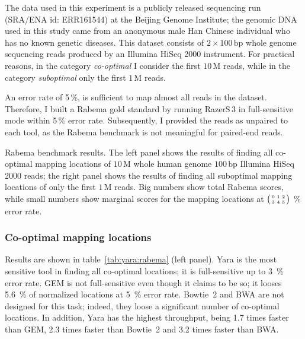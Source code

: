 The data used in this experiment is a publicly released sequencing run (SRA/ENA id: ERR161544) at the Beijing Genome Institute;
the genomic DNA used in this study came from an anonymous male Han Chinese individual who has no known genetic diseases.
This dataset consists of $2 \times 100\,\text{bp}$ whole genome sequencing reads produced by an Illumina HiSeq 2000 instrument.
For practical reasons, in the category \emph{co-optimal} I consider the first $10\,\text{M}$ reads, while in the category \emph{suboptimal} only the first $1\,\text{M}$ reads.

An error rate of 5\,\%, is sufficient to map almost all reads in the dataset.
Therefore, I built a Rabema gold standard by running RazerS\,3 in full-sensitive mode within 5\,\% error rate.
Subsequently, I provided the reads as unpaired to each tool, as the Rabema benchmark is not meaningful for paired-end reads.

\begin{table*}[t]
  \caption[Yara results in the Rabema benchmark]
  {
  \label{tab:yara:rabema}
    Rabema benchmark results.
    The left panel shows the results of finding all co-optimal mapping locations of $10\,\text{M}$ whole human genome $100\,\text{bp}$ Illumina HiSeq 2000 reads; the right panel shows the results of finding all suboptimal mapping locations of only the first $1\,\text{M}$ reads.
    Big numbers show total Rabema scores, while small numbers show marginal scores for the mapping locations at
    $\bigl(\begin{smallmatrix}\mbox{\tiny 0}&\mbox{\tiny 1}&\mbox{\tiny 2}\\\mbox{\tiny 3}&\mbox{\tiny 4}&\mbox{\tiny 5}\end{smallmatrix}\bigr)$ \% error rate.
    }
  \vspace{-3mm}
  \center
  \sffamily
  \resizebox{0.95\textwidth}{!}
  {
	\renewcommand{\tabcolsep}{0.8ex}
	
	
  }
\end{table*}

\subsubsection{Co-optimal mapping locations}
Results are shown in table~\ref{tab:yara:rabema} (left panel).
Yara is the most sensitive tool in finding all co-optimal locations; it is full-sensitive up to 3~\% error rate.
GEM is not full-sensitive even though it claims to be so; it looses 5.6~\% of normalized locations at 5~\% error rate.
Bowtie~2 and BWA are not designed for this task; indeed, they loose a significant number of co-optimal locations.
In addition, Yara has the highest throughput, being 1.7 times faster than GEM, 2.3 times faster than Bowtie~2 and 3.2 times faster than BWA.

